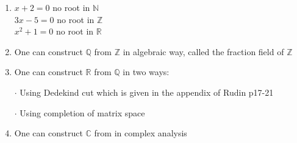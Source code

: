  \begin{rmk*}$ $
 	\begin{tcolorbox}
 		\begin{enumerate}
 		\item $x + 2 = 0$ no root in $\mathbb{N}$\\$3x - 5 = 0$ no root in $\mathbb{Z}$\\$x^2 + 1 = 0$ no root in $\mathbb{R}$
 		\item One can construct $\mathbb{Q}$ from $\mathbb{Z}$ in algebraic way, called the fraction field of $\mathbb{Z}$
 		\item One can construct $\mathbb{R}$ from $\mathbb{Q}$ in two ways:
 		
 		$\cdot$ Using Dedekind cut which is given in the appendix of Rudin p17-21
 		
 		$\cdot$ Using completion of matrix space
 		\item One can construct $\mathbb{C}$ from in complex analysis
 	\end{enumerate}
 	\end{tcolorbox}
 	
 \end{rmk*}

